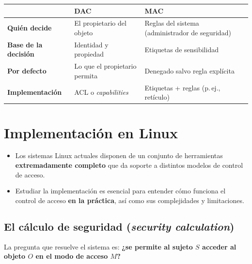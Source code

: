 \documentclass[11pt,a4paper]{report}
\begin{document}
\begin{center}
\small
{\setlength{\aboverulesep}{0pt}\setlength{\belowrulesep}{0pt}\renewcommand{\arraystretch}{1.3}%
\begin{tabularx}{\linewidth}{>{\raggedright\arraybackslash}p{3.2cm} !{\color{gray!45}\vrule width 0.2pt} >{\raggedright\arraybackslash}X !{\color{gray!45}\vrule width 0.2pt} >{\raggedright\arraybackslash}X}
\toprule
 & \textbf{DAC} & \textbf{MAC} \\
\midrule
\textbf{Quién decide} & El propietario del objeto & Reglas del sistema (administrador de seguridad) \\
\textbf{Base de la decisión} & Identidad y propiedad & Etiquetas de sensibilidad \\
\textbf{Por defecto} & Lo que el propietario permita & Denegado salvo regla explícita \\
\textbf{Implementación} & ACL o \emph{capabilities} & Etiquetas + reglas (p.\,ej., retículo) \\
\bottomrule
\end{tabularx}}
\end{center}
 
\chapter{Implementación en Linux}
 
\begin{itemize}
  \item Los sistemas Linux actuales disponen de un conjunto de herramientas \textbf{extremadamente completo} que da soporte a distintos modelos de control de acceso.
  \item Estudiar la implementación es esencial para entender cómo funciona el control de acceso \textbf{en la práctica}, así como sus complejidades y limitaciones.
\end{itemize}
 
\section{El cálculo de seguridad (\emph{security calculation})}
 
La pregunta que resuelve el sistema es: \textbf{¿se permite al sujeto $S$ acceder al objeto $O$ en el modo de acceso $M$?}
 
\end{document}
